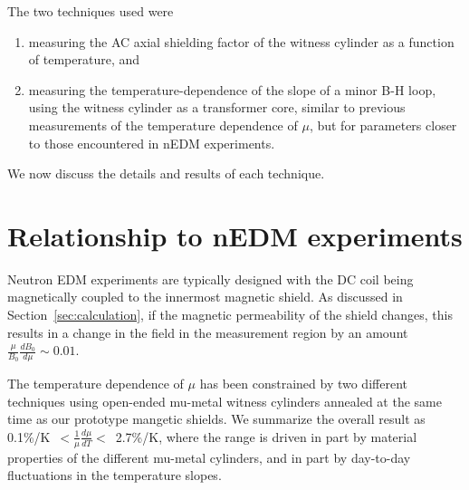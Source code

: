 \documentclass[review,number,sort&compress]{elsarticle}
\begin{document}
The two techniques used were
\begin{enumerate}
\item measuring the AC axial shielding factor of the witness cylinder
  as a function of temperature, and
\item measuring the temperature-dependence of the slope of a minor B-H
  loop, using the witness cylinder as a transformer core, similar to
  previous measurements of the temperature dependence of $\mu$, but
  for parameters closer to those encountered in nEDM experiments.
\end{enumerate}
We now discuss the details and results of each technique.







\section{Relationship to nEDM experiments}

Neutron EDM experiments are typically designed with the DC coil being
magnetically coupled to the innermost magnetic shield.  As discussed
in Section~\ref{sec:calculation}, if the magnetic permeability of the
shield changes, this results in a change in the field in the
measurement region by an amount $\frac{\mu}{B_0}\frac{dB_0}{d\mu}\sim
0.01$.

The temperature dependence of $\mu$ has been constrained by two
different techniques using open-ended mu-metal witness cylinders
annealed at the same time as our prototype mangetic shields.  We
summarize the overall result as
0.1\%/K~$<\frac{1}{\mu}\frac{d\mu}{dT}<$~2.7\%/K, where the range is
driven in part by material properties of the different mu-metal
cylinders, and in part by day-to-day fluctuations in the temperature
slopes.
\end{document}

